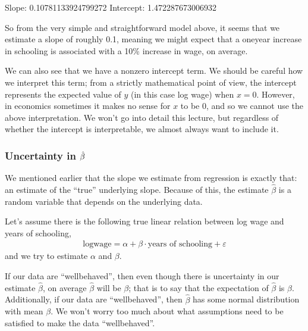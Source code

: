 \documentclass[letterpaper,10pt,english]{jupyterBook}
\begin{document}
\begin{sphinxVerbatim}[commandchars=\\\{\}]
Slope:  0.10781133924799272
Intercept:  1.472287673006932
\end{sphinxVerbatim}

\noindent{}

\sphinxAtStartPar
So from the very simple and straight\sphinxhyphen{}forward model above, it seems that we estimate a slope of roughly 0.1, meaning we might expect that a one\sphinxhyphen{}year increase in schooling is associated with a 10\% increase in wage, on average.

\sphinxAtStartPar
We can also see that we have a non\sphinxhyphen{}zero intercept term. We should be careful how we interpret this term; from a strictly mathematical point of view, the intercept represents the expected value of \(y\) (in this case log wage) when \(x = 0\). However, in economics sometimes it makes no sense for \(x\) to be 0, and so we cannot use the above interpretation. We won’t go into detail this lecture, but regardless of whether the intercept is interpretable, we almost always want to include it.


\subsubsection{Uncertainty in \protect\(\hat{\beta}\protect\)}
\label{\detokenize{content/11-econometrics/single-variable:uncertainty-in-hat-beta}}
\sphinxAtStartPar
We mentioned earlier that the slope we estimate from regression is exactly that: an estimate of the “true” underlying slope. Because of this, the estimate \(\hat{\beta}\) is a random variable that depends on the underlying data.

\sphinxAtStartPar
Let’s assume there is the following true linear relation between log wage and years of schooling,
\begin{equation*}
\begin{split}
\text{logwage} = \alpha + \beta \cdot \text{years of schooling} + \varepsilon
\end{split}
\end{equation*}
\sphinxAtStartPar
and we try to estimate \(\alpha\) and \(\beta\).

\sphinxAtStartPar
If our data are “well\sphinxhyphen{}behaved”, then even though there is uncertainty in our estimate \(\hat{\beta}\), on average \(\hat{\beta}\) will be \(\beta\); that is to say that the expectation of \(\hat{\beta}\) is \(\beta\). Additionally, if our data are “well\sphinxhyphen{}behaved”, then \(\hat{\beta}\) has some normal distribution with mean \(\beta\). We won’t worry too much about what assumptions need to be satisfied to make the data “well\sphinxhyphen{}behaved”.
\end{document}
